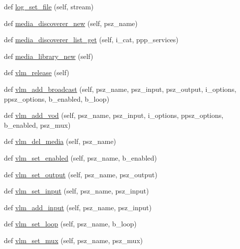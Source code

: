 \begin{DoxyCompactItemize}
\item 
def \hyperlink{classvlc_1_1_instance_a44432718b2b47222fcf097605de1bfad}{log\+\_\+set\+\_\+file} (self, stream)
\item 
def \hyperlink{classvlc_1_1_instance_ac61d7656e60513812c564af4487dcb67}{media\+\_\+discoverer\+\_\+new} (self, psz\+\_\+name)
\item 
def \hyperlink{classvlc_1_1_instance_aa4bc2bb5925ba99e5946cb8daa03492e}{media\+\_\+discoverer\+\_\+list\+\_\+get} (self, i\+\_\+cat, ppp\+\_\+services)
\item 
def \hyperlink{classvlc_1_1_instance_a1a0fe5012ac0f18e8b6dcbf35ac83780}{media\+\_\+library\+\_\+new} (self)
\item 
def \hyperlink{classvlc_1_1_instance_a68523ebc1badf01d410514dbc5d822de}{vlm\+\_\+release} (self)
\item 
def \hyperlink{classvlc_1_1_instance_a8ce4b26858673c7029810ca9c99b4e83}{vlm\+\_\+add\+\_\+broadcast} (self, psz\+\_\+name, psz\+\_\+input, psz\+\_\+output, i\+\_\+options, ppsz\+\_\+options, b\+\_\+enabled, b\+\_\+loop)
\item 
def \hyperlink{classvlc_1_1_instance_a4ef5661bf1bcdef3f131c1d4694c6fe3}{vlm\+\_\+add\+\_\+vod} (self, psz\+\_\+name, psz\+\_\+input, i\+\_\+options, ppsz\+\_\+options, b\+\_\+enabled, psz\+\_\+mux)
\item 
def \hyperlink{classvlc_1_1_instance_a24a1e2bc7e41b02303d2f397246da726}{vlm\+\_\+del\+\_\+media} (self, psz\+\_\+name)
\item 
def \hyperlink{classvlc_1_1_instance_a1096326419fe3760417950781576f535}{vlm\+\_\+set\+\_\+enabled} (self, psz\+\_\+name, b\+\_\+enabled)
\item 
def \hyperlink{classvlc_1_1_instance_ab791d7f564fbc01a818279368454a39c}{vlm\+\_\+set\+\_\+output} (self, psz\+\_\+name, psz\+\_\+output)
\item 
def \hyperlink{classvlc_1_1_instance_a45f0affea9ab90df05c660bccba514a5}{vlm\+\_\+set\+\_\+input} (self, psz\+\_\+name, psz\+\_\+input)
\item 
def \hyperlink{classvlc_1_1_instance_ab52ce0a6d96b77def1fd4a2e451fe2d4}{vlm\+\_\+add\+\_\+input} (self, psz\+\_\+name, psz\+\_\+input)
\item 
def \hyperlink{classvlc_1_1_instance_a8091fb7adc87dd1f5658e7cf0e1ed8b3}{vlm\+\_\+set\+\_\+loop} (self, psz\+\_\+name, b\+\_\+loop)
\item 
def \hyperlink{classvlc_1_1_instance_ae9782ac282ce7c000257f7f38393729f}{vlm\+\_\+set\+\_\+mux} (self, psz\+\_\+name, psz\+\_\+mux)
\item 

\end{DoxyCompactItemize}
